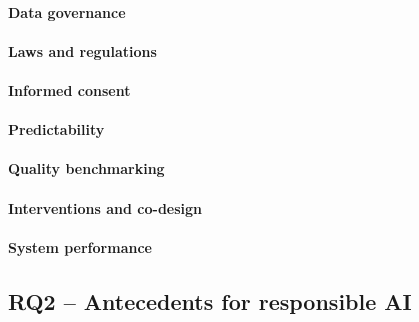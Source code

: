 \paragraph{Data governance}

\paragraph{Laws and regulations}

\paragraph{Informed consent}

\paragraph{Predictability}

\paragraph{Quality benchmarking}

\paragraph{Interventions and co-design}

\paragraph{System performance}






\subsection{RQ2 -- Antecedents for responsible AI}

